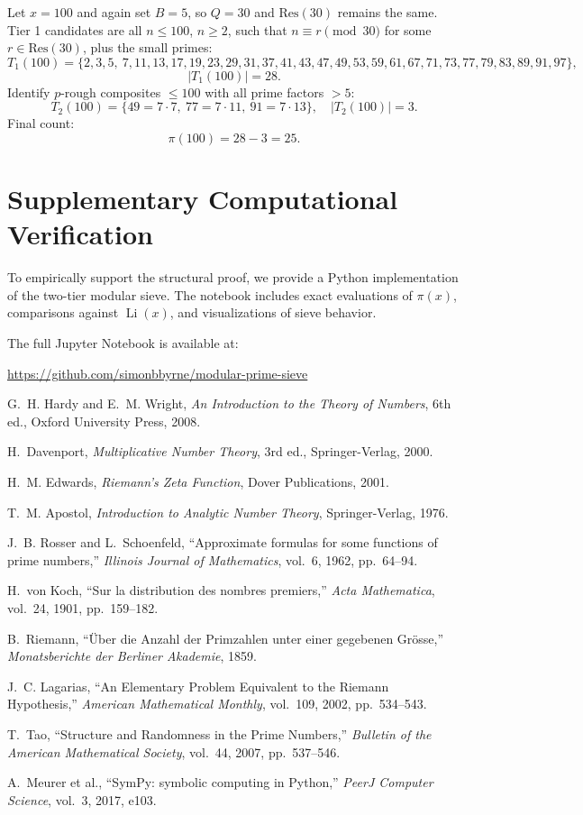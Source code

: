 \documentclass[11pt]{article}
\begin{document}
	Let $x = 100$ and again set $B = 5$, so $Q = 30$ and $\text{Res}(30)$ remains the same. Tier 1 candidates are all $n \leq 100$, $n \geq 2$, such that $n \equiv r \pmod{30}$ for some $r \in \text{Res}(30)$, plus the small primes:
	\[
	T_1(100) = \{2, 3, 5,\ 7, 11, 13, 17, 19, 23, 29, 31, 37, 41, 43, 47, 49, 53, 59, 61, 67, 71, 73, 77, 79, 83, 89, 91, 97\},
	\]
	\[
	|T_1(100)| = 28.
	\]
	Identify $p$-rough composites $\leq 100$ with all prime factors $> 5$:
	\[
	T_2(100) = \{49 = 7 \cdot 7,\ 77 = 7 \cdot 11,\ 91 = 7 \cdot 13\}, \quad |T_2(100)| = 3.
	\]
	Final count:
	\[
	\pi(100) = 28 - 3 = 25.
	\]
	
		
	\section*{Supplementary Computational Verification}
	
	To empirically support the structural proof, we provide a Python implementation of the two-tier modular sieve. The notebook includes exact evaluations of $\pi(x)$, comparisons against $\operatorname{Li}(x)$, and visualizations of sieve behavior.
	
	The full Jupyter Notebook is available at:
	
	\url{https://github.com/simonbbyrne/modular-prime-sieve}

	
	\begin{thebibliography}{99}
		
		G.~H. Hardy and E.~M. Wright, \textit{An Introduction to the Theory of Numbers}, 6th ed., Oxford University Press, 2008.
		
		H.~Davenport, \textit{Multiplicative Number Theory}, 3rd ed., Springer-Verlag, 2000.
		
		H.~M. Edwards, \textit{Riemann's Zeta Function}, Dover Publications, 2001.
		
		T.~M. Apostol, \textit{Introduction to Analytic Number Theory}, Springer-Verlag, 1976.
		
		J.~B. Rosser and L.~Schoenfeld, ``Approximate formulas for some functions of prime numbers,'' \textit{Illinois Journal of Mathematics}, vol.~6, 1962, pp.~64--94.
		
		H.~von Koch, ``Sur la distribution des nombres premiers,'' \textit{Acta Mathematica}, vol.~24, 1901, pp.~159--182.
		
		B.~Riemann, ``Über die Anzahl der Primzahlen unter einer gegebenen Grösse,'' \textit{Monatsberichte der Berliner Akademie}, 1859.
		
		J.~C. Lagarias, ``An Elementary Problem Equivalent to the Riemann Hypothesis,'' \textit{American Mathematical Monthly}, vol.~109, 2002, pp.~534--543.
		
		T.~Tao, ``Structure and Randomness in the Prime Numbers,'' \textit{Bulletin of the American Mathematical Society}, vol.~44, 2007, pp.~537--546.
		
		A.~Meurer et al., ``SymPy: symbolic computing in Python,'' \textit{PeerJ Computer Science}, vol.~3, 2017, e103.
		
	\end{thebibliography}
\end{document}
